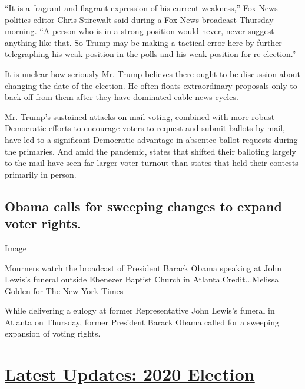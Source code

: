 ``It is a fragrant and flagrant expression of his current weakness,''
Fox News politics editor Chris Stirewalt said
\href{https://video.foxnews.com/v/6176638142001\#sp=show-clips}{during a
Fox News broadcast Thursday morning}. ``A person who is in a strong
position would never, never suggest anything like that. So Trump may be
making a tactical error here by further telegraphing his weak position
in the polls and his weak position for re-election.''

It is unclear how seriously Mr. Trump believes there ought to be
discussion about changing the date of the election. He often floats
extraordinary proposals only to back off from them after they have
dominated cable news cycles.

Mr. Trump's sustained attacks on mail voting, combined with more robust
Democratic efforts to encourage voters to request and submit ballots by
mail, have led to a significant Democratic advantage in absentee ballot
requests during the primaries. And amid the pandemic, states that
shifted their balloting largely to the mail have seen far larger voter
turnout than states that held their contests primarily in person.

\hypertarget{obama-calls-for-sweeping-changes-to-expand-voter-rights}{%
\subsection{Obama calls for sweeping changes to expand voter
rights.}\label{obama-calls-for-sweeping-changes-to-expand-voter-rights}}

Image

Mourners watch the broadcast of President Barack Obama speaking at John
Lewis's funeral outside Ebenezer Baptist Church in
Atlanta.Credit...Melissa Golden for The New York Times

While delivering a eulogy at former Representative John Lewis's funeral
in Atlanta on Thursday, former President Barack Obama called for a
sweeping expansion of voting rights.

\hypertarget{latest-updates-2020-election}{%
\section{\texorpdfstring{\href{https://www.nytimes3xbfgragh.onion/2020/07/31/us/elections/biden-vs-trump.html?action=click\&pgtype=Article\&state=default\&region=MAIN_CONTENT_1\&context=storylines_live_updates}{Latest
Updates: 2020
Election}}{Latest Updates: 2020 Election}}\label{latest-updates-2020-election}}

